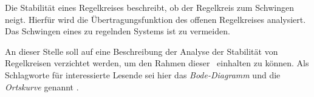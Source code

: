 
Die Stabilität eines Regelkreises beschreibt, ob der Regelkreis zum Schwingen neigt. Hierfür wird die Übertragungsfunktion des offenen Regelkreises analysiert. Das Schwingen eines zu regelnden Systems ist zu vermeiden. 

An dieser Stelle soll auf eine Beschreibung der Analyse der Stabilität von Regelkreisen verzichtet werden, um den Rahmen dieser \Arbeit\ einhalten zu können.
Als Schlagworte für interessierte Lesende sei hier das \textit{Bode-Diagramm} und die \textit{Ortskurve} genannt .

